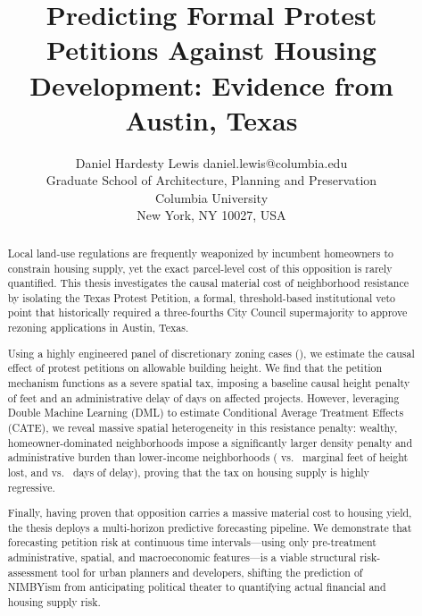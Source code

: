 \documentclass[twoside,11pt]{article}
\begin{document}
\title{Predicting Formal Protest Petitions Against Housing Development: Evidence from Austin, Texas}

\author{\name Daniel Hardesty Lewis \email daniel.lewis@columbia.edu \\
       \addr Graduate School of Architecture, Planning and Preservation\\
       Columbia University\\
       New York, NY 10027, USA}


\maketitle

\begin{abstract}%
Local land-use regulations are frequently weaponized by incumbent homeowners to constrain housing supply, yet the exact parcel-level cost of this opposition is rarely quantified. This thesis investigates the causal material cost of neighborhood resistance by isolating the Texas Protest Petition, a formal, threshold-based institutional veto point that historically required a three-fourths City Council supermajority to approve rezoning applications in Austin, Texas.

Using a highly engineered panel of discretionary zoning cases (\metricStudyYears{}), we estimate the causal effect of protest petitions on allowable building height. We find that the petition mechanism functions as a severe spatial tax, imposing a baseline causal height penalty of \metricRobustTreatContinuous{} feet and an administrative delay of \metricMeanDelayPenalty{} days on affected projects. However, leveraging Double Machine Learning (DML) to estimate Conditional Average Treatment Effects (CATE), we reveal massive spatial heterogeneity in this resistance penalty: wealthy, homeowner-dominated neighborhoods impose a significantly larger density penalty and administrative burden than lower-income neighborhoods (\metricCATEIncomeFourHeightMean{} vs.\ \metricCATEIncomeOneHeightMean{} marginal feet of height lost, and \metricCATEIncomeFourDelayMean{} vs.\ \metricCATEIncomeOneDelayMean{} days of delay), proving that the tax on housing supply is highly regressive.

Finally, having proven that opposition carries a massive material cost to housing yield, the thesis deploys a multi-horizon predictive forecasting pipeline. We demonstrate that forecasting petition risk at continuous time intervals---using only pre-treatment administrative, spatial, and macroeconomic features---is a viable structural risk-assessment tool for urban planners and developers, shifting the prediction of NIMBYism from anticipating political theater to quantifying actual financial and housing supply risk.
\end{abstract}
\end{document}
